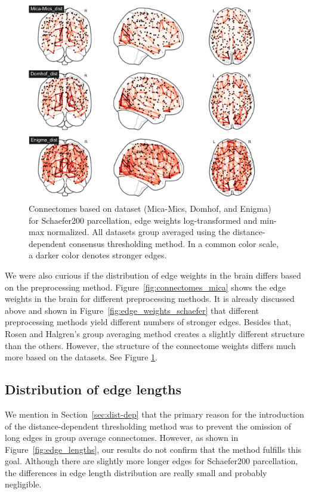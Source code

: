 \begin{figure}
\begin{center}
    \includegraphics[width=0.9\textwidth]{images/manually_created/datasets.png}
  \end{center}
  \caption[Connectomes based on dataset]{Connectomes based on dataset (Mica-Mics, Domhof, and Enigma) for Schaefer200 parcellation, edge weights log-transformed and min-max normalized. All datasets group averaged using the distance-dependent consensus thresholding method. In a common color scale, a darker color denotes stronger edges.}
  \label{fig:connectomes_by_dataset}
\end{figure}

We were also curious if the distribution of edge weights in the brain differs based on the preprocessing method. Figure~\ref{fig:connectomes_mica} shows the edge weights in the brain for different preprocessing methods. It is already discussed above and shown in Figure~\ref{fig:edge_weights_schaefer} that different preprocessing methods yield different numbers of stronger edges. Besides that, Rosen and Halgren's group averaging method creates a slightly different structure than the others. However, the structure of the connectome weights differs much more based on the datasets. See Figure \ref{fig:connectomes_by_dataset}. 

\subsection{Distribution of edge lengths}

We mention in Section~\ref{sec:dist-dep} that the primary reason for the introduction of the distance-dependent thresholding method was to prevent the omission of long edges in group average connectomes. However, as shown in Figure~\ref{fig:edge_lengths}, our results do not confirm that the method fulfills this goal. Although there are slightly more longer edges for Schaefer200 parcellation, the differences in edge length distribution are really small and probably negligible. 

